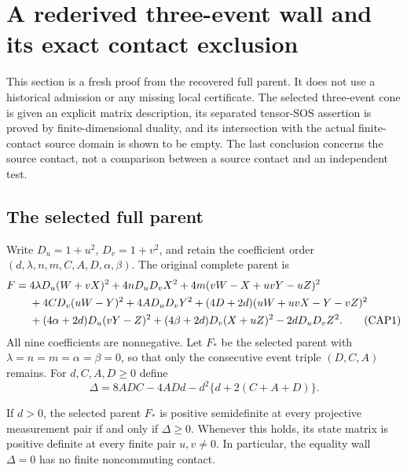 \section{A rederived three-event wall and its exact contact exclusion}
\label{sec:rederived-three-event-contact}

This section is a fresh proof from the recovered full parent.  It does
not use a historical admission or any missing local certificate.  The
selected three-event cone is given an explicit matrix description, its
separated tensor-SOS assertion is proved by finite-dimensional duality,
and its intersection with the actual finite-contact source domain is
shown to be empty.  The last conclusion concerns the source contact,
not a comparison between a source contact and an independent test.

\subsection{The selected full parent}

Write $D_u=1+u^2$, $D_v=1+v^2$, and retain the coefficient order
$(d,\lambda,n,m,C,A,D,\alpha,\beta)$.  The original complete parent is
\begin{align}
F={}&4\lambda D_u(W+vX)^2+4nD_uD_vX^2
 +4m(vW-X+uvY-uZ)^2\notag\\
&+4CD_v(uW-Y)^2+4AD_uD_vY^2
 +(4D+2d)(uW+uvX-Y-vZ)^2\notag\\
&+(4\alpha+2d)D_u(vY-Z)^2
 +(4\beta+2d)D_v(X+uZ)^2-2dD_uD_vZ^2.
\tag{CAP1}
\end{align}
All nine coefficients are nonnegative.  Let $F_*$ be the selected parent
with $\lambda=n=m=\alpha=\beta=0$, so that only the consecutive event
triple $(D,C,A)$ remains.  For $d,C,A,D\geq0$ define
\[
\Delta=8ADC-4ADd-d^2\{d+2(C+A+D)\}.
\tag{CAP2}
\]

\begin{proposition}
If $d>0$, the selected parent $F_*$ is positive semidefinite at every
projective measurement pair if and only if $\Delta\geq0$.  Whenever
this holds, its state matrix is positive definite at every finite pair
$u,v\ne0$.  In particular, the equality wall $\Delta=0$ has no finite
noncommuting contact.
\end{proposition}

